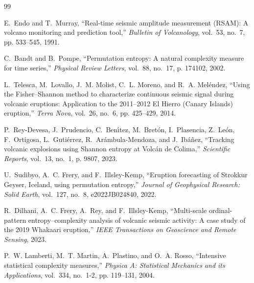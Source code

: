 \documentclass[journal]{IEEEtran}
\begin{document}
\begin{thebibliography}{99}

E.~Endo and T.~Murray, ``Real-time seismic amplitude measurement (RSAM): A volcano monitoring and prediction tool,'' \emph{Bulletin of Volcanology}, vol.~53, no.~7, pp. 533--545, 1991.

C.~Bandt and B.~Pompe, ``Permutation entropy: A natural complexity measure for time series,'' \emph{Physical Review Letters}, vol.~88, no.~17, p. 174102, 2002.

L.~Telesca, M.~Lovallo, J.~M. Molist, C.~L. Moreno, and R.~A. Mel{\'e}ndez, ``Using the Fisher--Shannon method to characterize continuous seismic signal during volcanic eruptions: Application to the 2011--2012 El Hierro (Canary Islands) eruption,'' \emph{Terra Nova}, vol.~26, no.~6, pp. 425--429, 2014.

P.~Rey-Devesa, J.~Prudencio, C.~Ben{\'\i}tez, M.~Bret{\'o}n, I.~Plasencia, Z.~Le{\'o}n, F.~Ortigosa, L.~Guti{\'e}rrez, R.~Ar{\'a}mbula-Mendoza, and J.~Ib{\'a}{\~n}ez, ``Tracking volcanic explosions using Shannon entropy at Volc{\'a}n de Colima,'' \emph{Scientific Reports}, vol.~13, no.~1, p. 9807, 2023.

U.~Sudibyo, A.~C. Frery, and F.~Illsley-Kemp, ``Eruption forecasting of Strokkur Geyser, Iceland, using permutation entropy,'' \emph{Journal of Geophysical Research: Solid Earth}, vol.~127, no.~8, e2022JB024840, 2022.

R.~Dilhani, A.~C. Frery, A.~Rey, and F.~Illsley-Kemp, ``Multi-scale ordinal-pattern entropy--complexity analysis of volcanic seismic activity: A case study of the 2019 Whakaari eruption,'' \emph{IEEE Transactions on Geoscience and Remote Sensing}, 2023.

P.~W. Lamberti, M.~T. Martin, A.~Plastino, and O.~A. Rosso, ``Intensive statistical complexity measures,'' \emph{Physica A: Statistical Mechanics and its Applications}, vol.~334, no.~1-2, pp. 119--131, 2004.

\end{thebibliography}
\end{document}
